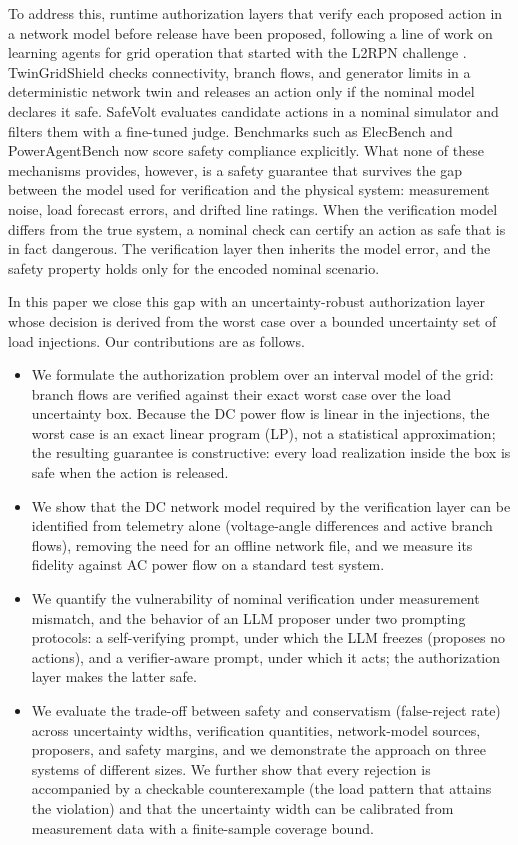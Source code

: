 \documentclass[11pt,a4paper]{article}
\begin{document}
To address this, runtime authorization layers that verify each proposed action in
a network model before release have been proposed, following a line of work on
learning agents for grid operation that started with the L2RPN challenge
\cite{marot2022}. TwinGridShield
\cite{twingridshield2026} checks connectivity, branch flows, and generator limits
in a deterministic network twin and releases an action only if the nominal model
declares it safe. SafeVolt \cite{safevolt2026} evaluates candidate actions in a
nominal simulator and filters them with a fine-tuned judge. Benchmarks such as
ElecBench \cite{elecbench2025} and PowerAgentBench \cite{poweragentbenchss2026,poweragentbenchdyn2026}
now score safety compliance explicitly. What none of these mechanisms provides,
however, is a safety guarantee that survives the gap between the model used for
verification and the physical system: measurement noise, load forecast errors,
and drifted line ratings. When the verification model differs from the true
system, a nominal check can certify an action as safe that is in fact dangerous.
The verification layer then inherits the model error, and the safety property
holds only for the encoded nominal scenario.

In this paper we close this gap with an uncertainty-robust authorization layer
whose decision is derived from the worst case over a bounded uncertainty set of
load injections. Our contributions are as follows.

\begin{itemize}
\item We formulate the authorization problem over an interval model of the grid:
branch flows are verified against their exact worst case over the load
uncertainty box. Because the DC power flow is linear in the injections, the
worst case is an exact linear program (LP), not a statistical approximation;
the resulting guarantee is constructive: every load realization inside the box
is safe when the action is released.
\item We show that the DC network model required by the verification layer can be
identified from telemetry alone (voltage-angle differences and active branch
flows), removing the need for an offline network file, and we measure its
fidelity against AC power flow on a standard test system.
\item We quantify the vulnerability of nominal verification under measurement
mismatch, and the behavior of an LLM proposer under two prompting protocols:
a self-verifying prompt, under which the LLM freezes (proposes no actions), and
a verifier-aware prompt, under which it acts; the authorization layer makes the
latter safe.
\item We evaluate the trade-off between safety and conservatism (false-reject
rate) across uncertainty widths, verification quantities, network-model
sources, proposers, and safety margins, and we demonstrate the approach on
three systems of different sizes. We further show that every rejection is
accompanied by a checkable counterexample (the load pattern that attains the
violation) and that the uncertainty width can be calibrated from measurement
data with a finite-sample coverage bound.
\end{itemize}
\end{document}
